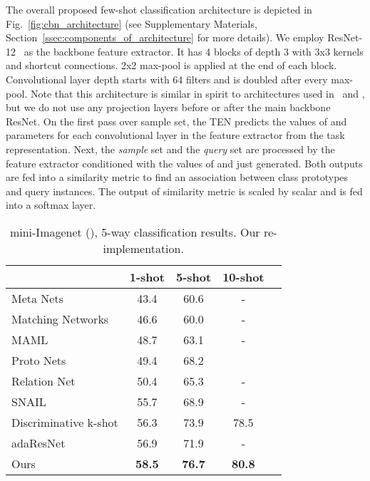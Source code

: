 \documentclass{article}
\begin{document}
The overall proposed few-shot classification architecture is depicted in Fig.~\ref{fig:cbn_architecture} (see Supplementary Materials, Section~\ref{ssec:components_of_architecture} for more details). We employ ResNet-12~\citep{He2016Deep} as the backbone feature extractor. It has 4 blocks of depth 3 with 3x3 kernels and shortcut connections. 2x2 max-pool is applied at the end of each block. Convolutional layer depth starts with 64 filters and is doubled after every max-pool. Note that this architecture is similar in spirit to architectures used in~\citep{Bauer2017discriminative} and \citep{munkhdalai2018rapid}, but we do not use any projection layers before or after the main backbone ResNet. On the first pass over sample set, the TEN predicts the values of  and  parameters for each convolutional layer in the feature extractor from the task representation. Next, the \emph{sample} set and the \emph{query} set are processed by the feature extractor conditioned with the values of  and  just generated. Both outputs are fed into a similarity metric to find an association between class prototypes and query instances. The output of similarity metric is scaled by scalar  and is fed into a softmax layer.




\begin{table}[t!]
\centering
\label{table:key_results}
\caption{mini-Imagenet (\citet{vinyals2016matching}), 5-way classification results. Our re-implementation.}
\label{table:sota}
\begin{tabular}{@{}lccc@{}r}
\toprule
\multicolumn{1}{c}{} &  \multicolumn{1}{c}{1-shot} & \multicolumn{1}{c}{5-shot} & \multicolumn{1}{c}{10-shot} \\ \midrule 
Meta Nets \citep{ravi2016optimization} & 43.4 & 60.6 & -  \\
Matching Networks \citep{vinyals2016matching} & 46.6 & 60.0 & - \\
MAML \citep{finn2017model} & 48.7 & 63.1 & -  \\
Proto Nets \citep{snell2017prototypical} & 49.4 & 68.2 &   \\
Relation Net \citep{sung2018learning} & 50.4 & 65.3 & - \\ 
SNAIL \citep{mishra2018simle} & 55.7 & 68.9 & - \\ 
Discriminative k-shot \citep{Bauer2017discriminative} & 56.3 & 73.9 & 78.5 \\ 
adaResNet \citep{munkhdalai2018rapid} & 56.9 & 71.9 & - \\ \midrule
Ours & \textbf{58.5} & \textbf{76.7} &  \textbf{80.8} \\ \bottomrule
\end{tabular} 
\end{table}
\end{document}
